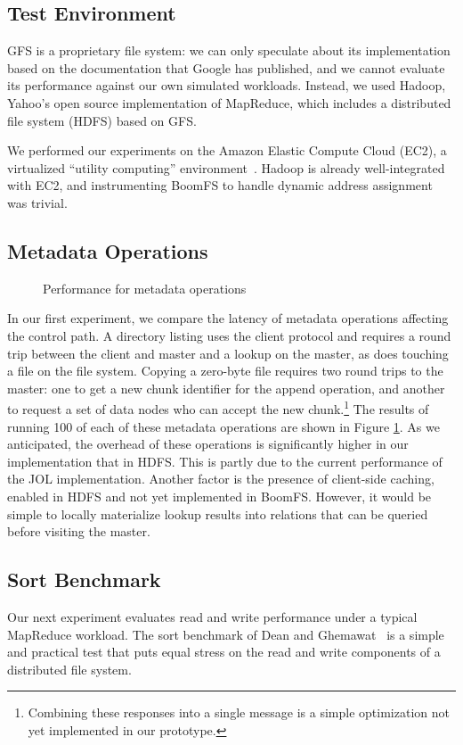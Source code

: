 \documentclass[twocolumn]{article}
\begin{document}
\subsection{Test Environment}
GFS is a proprietary file system: we can only speculate about its
implementation based on the documentation that Google has published,
and we cannot evaluate its performance against our own simulated
workloads.  Instead, we used Hadoop, Yahoo's open source
implementation of MapReduce, which includes a distributed file system
(HDFS) based on GFS.

We performed our experiments on the Amazon Elastic Compute Cloud
(EC2), a virtualized ``utility computing''
environment~\cite{amazon-ec2}. Hadoop is already well-integrated with
EC2, and instrumenting BoomFS to handle dynamic address assignment was
trivial.

\subsection{Metadata Operations}
\begin{figure}
\centering
{}
\caption{Performance for metadata operations}
\label{fig:metadata-perf}
\end{figure}

In our first experiment, we compare the latency of metadata operations
affecting the control path.  A directory listing uses the client
protocol and requires a round trip between the client and master and a
lookup on the master, as does touching a file on the file system.
Copying a zero-byte file requires two round trips to the master: one
to get a new chunk identifier for the append operation, and another to
request a set of data nodes who can accept the new
chunk.\footnote{Combining these responses into a single message is a
  simple optimization not yet implemented in our prototype.}  The
results of running 100 of each of these metadata operations are shown
in Figure \ref{fig:metadata-perf}.  As we anticipated, the overhead of
these operations is significantly higher in our implementation that in
HDFS.  This is partly due to the current performance of the JOL
implementation. Another factor is the presence of client-side caching,
enabled in HDFS and not yet implemented in BoomFS. However, it would
be simple to locally materialize lookup results into relations that
can be queried before visiting the master.

\subsection{Sort Benchmark}
Our next experiment evaluates read and write performance under a
typical MapReduce workload.  The sort benchmark of Dean and
Ghemawat~\cite{mapreduce} is a simple and practical test that puts
equal stress on the read and write components of a distributed
file system.
\end{document}
